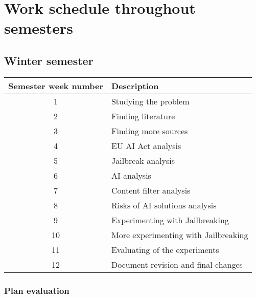 \setcounter{figure}{0}
\setcounter{listing}{0}

\chapter{Work schedule throughout semesters \label{cha:work_schedule} }

\section{Winter semester}

\begin{table}[hp]
    \centering
    \begin{tabular}{|c|l|}
    \hline
    \textbf{Semester week number} & \textbf{Description} \\ \hline

    1 & Studying the problem  \\ \hline
    2 & Finding literature \\ \hline
    3 & Finding more sources \\ \hline
    4 & EU AI Act analysis \\ \hline
    5 & Jailbreak analysis \\ \hline
    6 & AI analysis \\ \hline
    7 & Content filter analysis \\ \hline
    8 & Risks of AI solutions analysis \\ \hline
    9 & Experimenting with Jailbreaking \\ \hline
    10 & More experimenting with Jailbreaking \\ \hline
    11 & Evaluating of the experiments \\ \hline
    12 & Document revision and final changes \\ \hline
    \end{tabular}
\end{table}

\subsection{Plan evaluation}

